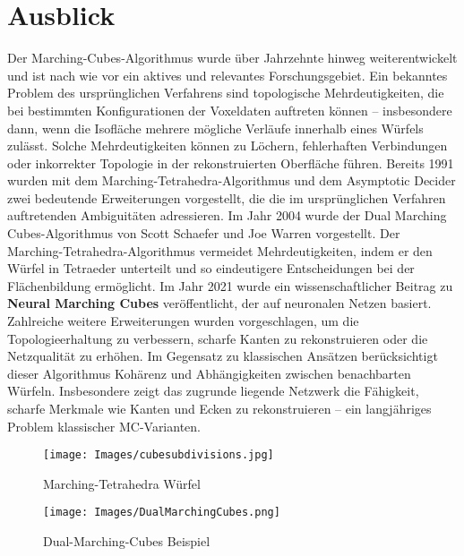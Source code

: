 \documentclass[12pt]{article}
\begin{document}
\section{Ausblick}
Der Marching-Cubes-Algorithmus wurde über Jahrzehnte hinweg weiterentwickelt und ist nach wie vor ein aktives und relevantes Forschungsgebiet.
Ein bekanntes Problem des ursprünglichen Verfahrens sind topologische Mehrdeutigkeiten, die bei bestimmten Konfigurationen der Voxeldaten auftreten können – insbesondere dann,
wenn die Isofläche mehrere mögliche Verläufe innerhalb eines Würfels zulässt.
Solche Mehrdeutigkeiten können zu Löchern, fehlerhaften Verbindungen oder inkorrekter Topologie in der rekonstruierten Oberfläche führen.
Bereits 1991 wurden mit dem Marching-Tetrahedra-Algorithmus und dem Asymptotic Decider zwei bedeutende Erweiterungen vorgestellt, die die im ursprünglichen Verfahren auftretenden Ambiguitäten adressieren.
Im Jahr 2004 wurde der Dual Marching Cubes-Algorithmus von Scott Schaefer und Joe Warren vorgestellt.
Der Marching-Tetrahedra-Algorithmus vermeidet Mehrdeutigkeiten, indem er den Würfel in Tetraeder unterteilt und so eindeutigere Entscheidungen bei der Flächenbildung ermöglicht.
Im Jahr 2021 wurde ein wissenschaftlicher Beitrag zu \textbf{Neural Marching Cubes} veröffentlicht, der auf neuronalen Netzen basiert.
Zahlreiche weitere Erweiterungen wurden vorgeschlagen, um die Topologieerhaltung zu verbessern, scharfe Kanten zu rekonstruieren oder die Netzqualität zu erhöhen.
Im Gegensatz zu klassischen Ansätzen berücksichtigt dieser Algorithmus Kohärenz und Abhängigkeiten zwischen benachbarten Würfeln.
Insbesondere zeigt das zugrunde liegende Netzwerk die Fähigkeit, scharfe Merkmale wie Kanten und Ecken zu rekonstruieren – ein langjähriges Problem klassischer MC-Varianten.
\begin{figure}[H]
  \centering
  \begin{minipage}[t]{0.48\textwidth}
    \centering
    \texttt{[image: Images/cubesubdivisions.jpg]}
    \caption{Marching-Tetrahedra Würfel}
    \label{fig:cube-subdivisions-a}
  \end{minipage}
  \hfill
  \begin{minipage}[t]{0.48\textwidth}
    \centering
    \texttt{[image: Images/DualMarchingCubes.png]}
    \caption{Dual-Marching-Cubes Beispiel}
    \label{fig:cube-subdivisions-b}
  \end{minipage}
\end{figure}
\end{document}
